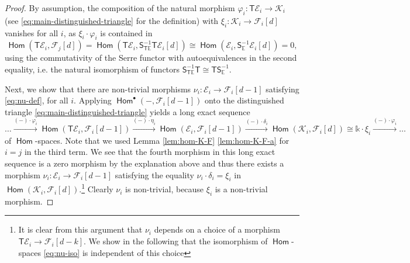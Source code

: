 \documentclass[a4paper,11pt, reqno]{amsart}
\def\E{\mathbb E}
\def\sE{\mathscr{E}}
\def\sF{\mathscr{F}}
\def\sK{\mathscr{K}}
\newcommand{\opname}[1]{\operatorname{\mathsf{#1}}}
\newcommand{\Hom}{\opname{Hom}}
\newcommand{\bS}{\mathsf{S}}
\newcommand{\bT}{\mathsf{T}}
\theoremstyle{plain}
\theoremstyle{definition}
\numberwithin{equation}{section}
\newlength{\arrow}
\begin{document}
\begin{proof}
 By assumption, the composition of the natural morphism $\varphi_i \colon \bT\sE_i \to \sK_i $ (see \eqref{eq:main-distinguished-triangle} for the definition) with $\xi_i \colon \sK_i \to \sF_i [d]$ vanishes for all $i$, as $\xi_i \cdot \varphi_i$ is contained in
\[
\Hom (\bT \sE_i , \sF_j [d] ) = \Hom ( \bT\sE_i , \bS^{-1}_{\bT \E} \bT \sE_i[d]  ) \cong \Hom ( \sE_i , \bS^{-1}_{\E}\sE_i [d]) =0 , 
\]
using the commutativity of the Serre functor with autoequivalences in the second equality, i.e. the natural isomorphism of functors $\bS_{\bT\E}^{-1} \bT \cong \bT \bS^{-1}_{\E}$.



Next, we show that there are non-trivial morphisms $\nu_i  \colon \sE_i \to \sF_i [d-1]$ satisfying \eqref{eq:nu-def}, for all $i$.
Applying $\Hom^\bullet ( - , \sF_i [d-1] )$ onto the distinguished triangle 
\eqref{eq:main-distinguished-triangle} 
yields a long exact sequence
\[
\ldots \xrightarrow{(-)\cdot \varphi_i} \Hom ( \bT  \sE_i   , \sF_i [d-1] ) 
\xrightarrow{(-) \cdot \eta_i } \Hom ( \sE_i , \sF_i [d-1] ) \xrightarrow{(-)\cdot \delta_i} \Hom ( \sK_i  , \sF_i [d] ) \cong \mathbb{k} \cdot \xi_i \xrightarrow{(-)\cdot \varphi_i} \ldots
\]
of $\Hom$-spaces.
Note that we used Lemma \ref{lem:hom-K-F} \eqref{lem:hom-K-F-a} for $i=j$ in the third term.
We see that the fourth morphism in this long exact sequence is a zero morphism by the explanation above
and thus 
there exists a morphism $\nu_i \colon \sE_i \to \sF_i  [d-1]$ satisfying the equality $\nu_i \cdot \delta_i = \xi_i$ in $\Hom (\sK_i , \sF_i  [d])$.\footnote{It is clear from this argument that $\nu_i$ depends on a choice of a morphism $\bT\sE_i \to \sF_i [d-k]$. We show in the following that the isomorphism of $\Hom$-spaces \eqref{eq:nu-iso} is independent of this choice}
Clearly $\nu_i $ is non-trivial, because $\xi_i$ is a non-trivial morphism.


\end{proof}
\end{document}

